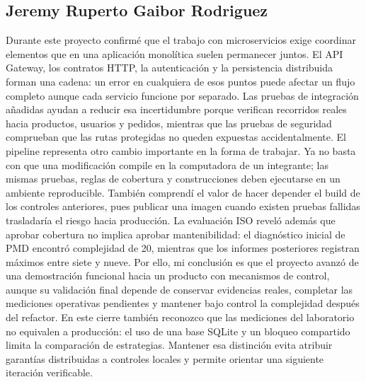 \documentclass[12pt,a4paper]{article}
\begin{document}
\subsection{Jeremy Ruperto Gaibor Rodriguez}
Durante este proyecto confirmé que el trabajo con microservicios exige coordinar elementos que en una aplicación monolítica suelen permanecer juntos. El API Gateway, los contratos HTTP, la autenticación y la persistencia distribuida forman una cadena: un error en cualquiera de esos puntos puede afectar un flujo completo aunque cada servicio funcione por separado. Las pruebas de integración añadidas ayudan a reducir esa incertidumbre porque verifican recorridos reales hacia productos, usuarios y pedidos, mientras que las pruebas de seguridad comprueban que las rutas protegidas no queden expuestas accidentalmente. El pipeline representa otro cambio importante en la forma de trabajar. Ya no basta con que una modificación compile en la computadora de un integrante; las mismas pruebas, reglas de cobertura y construcciones deben ejecutarse en un ambiente reproducible. También comprendí el valor de hacer depender el build de los controles anteriores, pues publicar una imagen cuando existen pruebas fallidas trasladaría el riesgo hacia producción. La evaluación ISO reveló además que aprobar cobertura no implica aprobar mantenibilidad: el diagnóstico inicial de PMD encontró complejidad de 20, mientras que los informes posteriores registran máximos entre siete y nueve. Por ello, mi conclusión es que el proyecto avanzó de una demostración funcional hacia un producto con mecanismos de control, aunque su validación final depende de conservar evidencias reales, completar las mediciones operativas pendientes y mantener bajo control la complejidad después del refactor. En este cierre también reconozco que las mediciones del laboratorio no equivalen a producción: el uso de una base SQLite y un bloqueo compartido limita la comparación de estrategias. Mantener esa distinción evita atribuir garantías distribuidas a controles locales y permite orientar una siguiente iteración verificable.
\end{document}
